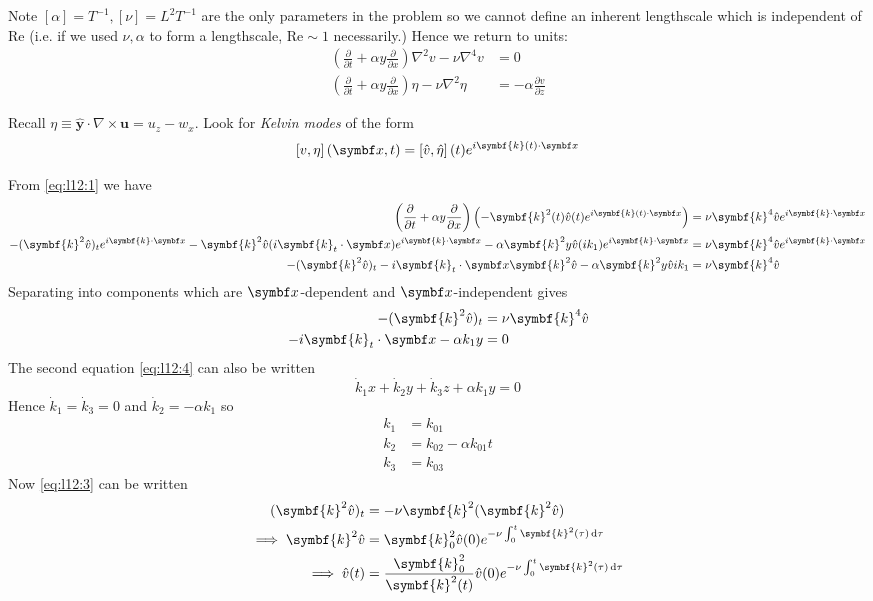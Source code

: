 \documentclass{jknotes}
\renewcommand{\u}{\symbf{u}}
\newcommand{\ReN}{\text{Re}}
\renewcommand{\k}{\symbf{k}}
\begin{document}
Note $\left[\alpha\right] = T^{-1}, \left[\nu\right] = L^2 T^{-1}$ are the
only parameters in the problem so we
cannot define an inherent lengthscale which is independent of $\ReN$ (i.e. if
we used $\nu, \alpha$ to form a lengthscale, $\ReN \sim 1$ necessarily.)
Hence we return to units:
\begin{align}
	\left(\frac{\partial}{\partial t} + \alpha y \frac{\partial}{\partial x}\right)
	\nabla^2 v -\nu \nabla^4 v &= 0 \label{eq:l12:1}\\
	\left(\frac{\partial}{\partial t} + \alpha y \frac{\partial}{\partial x}\right)
	\eta - \nu \nabla^2 \eta &= -\alpha \frac{\partial v}{\partial z}
	\label{eq:l12:2}
\end{align}

Recall $\eta \equiv \hat{\symbf{y}}\cdot\nabla \times \u = u_z - w_x$. Look
for \emph{Kelvin modes} of the form
\begin{equation}
	\left[v,\eta\right](\x,t) =
	\left[\hat{v},\hat{\eta}\right](t)e^{i\symbf{k}(t)\cdot\x}
\end{equation}

From \eqref{eq:l12:1} we have
\begin{align}
	\left(\frac{\partial}{\partial t} + \alpha y \frac{\partial}{\partial
	x}\right) \left(-\k^2(t)\hat{v}(t)e^{i\k(t)\cdot\x}\right) 
	&= \nu \k^4 \hat{v}e^{i\k\cdot\x} \\
	-(\k^2 \hat{v})_t e^{i\k\cdot\x} - \k^2
	\hat{v}(i\k_t\cdot\x)e^{i\k\cdot\x} - \alpha \k^2 y
	\hat{v}(ik_1)e^{i\k\cdot\x} &= \nu \k^4 \hat{v}e^{i\k\cdot\x} \\
	-(\k^2\hat{v})_t - i\k_t\cdot\x\k^2\hat{v} - \alpha \k^2 y \hat{v}ik_1
								&= \nu \k^4 \hat{v}
\end{align}
Separating into components which are $\x$-dependent and $\x$-independent gives
\begin{align}
	-(\k^2\hat{v})_t &= \nu \k^4 \hat{v} \label{eq:l12:3}\\
	-i\k_t\cdot\x - \alpha k_1 y &= 0 \label{eq:l12:4}
\end{align}
The second equation \eqref{eq:l12:4} can also be written
\begin{equation}
	\dot{k}_1 x + \dot{k}_2 y + \dot{k}_3 z + \alpha k_1 y = 0
\end{equation}
Hence $\dot{k}_1 = \dot{k}_3 = 0$ and $\dot{k}_2 = -\alpha k_1$ so
\begin{align}
	k_1 &= k_{01} \\
	k_2 &= k_{02} - \alpha k_{01} t \\
	k_3 &= k_{03}
\end{align}
Now \eqref{eq:l12:3} can be written
\begin{align}
	(\k^2 \hat{v})_t &= -\nu \k^2 (\k^2 \hat{v}) \\
	\implies \k^2 \hat{v} &= \k_0^2 \hat{v}(0) e^{-\nu \int_0^t
	\k^2(\tau)\,\diffd \tau} \\
		\implies \hat{v}(t) &= \frac{\k_0^2}{\k^2(t)} \hat{v}(0) e^{-\nu \int_0^t
	\k^2(\tau)\,\diffd \tau} 
\end{align}
\end{document}
